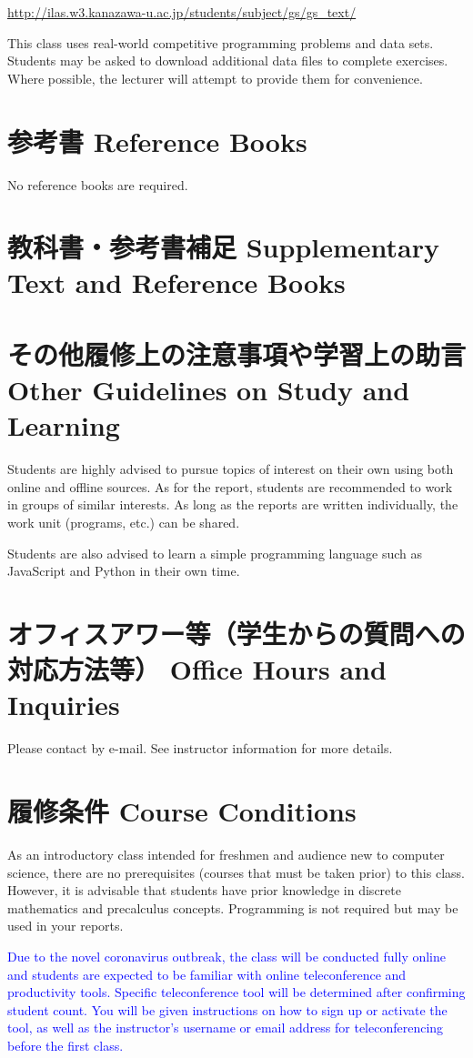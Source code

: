 \documentclass{article}
\begin{document}
\url{http://ilas.w3.kanazawa-u.ac.jp/students/subject/gs/gs_text/}

This class uses real-world competitive programming problems and data sets. Students may be asked to download additional data files to complete exercises. Where possible, the lecturer will attempt to provide them for convenience.

\section{参考書 Reference Books}
No reference books are required.

\section{教科書・参考書補足 Supplementary Text and Reference Books}

\section{その他履修上の注意事項や学習上の助言 Other Guidelines on Study and Learning}
Students are highly advised to pursue topics of interest on their own using both online and offline sources. As for the report, students are recommended to work in groups of similar interests. As long as the reports are written individually, the work unit (programs, etc.) can be shared.

Students are also advised to learn a simple programming language such as JavaScript and Python in their own time.

\section{オフィスアワー等（学生からの質問への対応方法等） Office Hours and Inquiries}
Please contact by e-mail. See instructor information for more details.

\section{履修条件 Course Conditions}
As an introductory class intended for freshmen and audience new to computer science, there are no prerequisites (courses that must be taken prior) to this class. However, it is advisable that students have prior knowledge in discrete mathematics and precalculus concepts. Programming is not required but may be used in your reports.

\textcolor{blue}{Due to the novel coronavirus outbreak, the class will be conducted fully online and students are expected to be familiar with online teleconference and productivity tools. Specific teleconference tool will be determined after confirming student count. You will be given instructions on how to sign up or activate the tool, as well as the instructor's username or email address for teleconferencing before the first class.}
\end{document}
